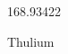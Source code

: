 \documentclass[12pt]{article}
\begin{document}
\hfill{}
\vfill
\begin{center}
  {\fontsize{50}{60}
  }

  168.93422

Thulium
\end{center}
\vfill
\end{document}
